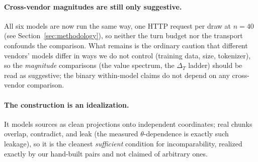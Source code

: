 \documentclass[11pt]{article}
\theoremstyle{plain}
\theoremstyle{definition}
\theoremstyle{remark}
\begin{document}
\paragraph{Cross-vendor magnitudes are still only suggestive.} All six models are now run the same
way, one HTTP request per draw at $n=40$ (see Section~\ref{sec:methodology}), so neither the turn
budget nor the transport confounds the comparison. What remains is the
ordinary caution that different vendors' models differ in ways we do not control (training data,
size, tokenizer), so the \emph{magnitude} comparisons (the value spectrum, the $\Delta_T$ ladder)
should be read as suggestive; the binary within-model claims do not depend on any cross-vendor
comparison.

\paragraph{The construction is an idealization.} It models sources as clean projections onto
independent coordinates; real chunks overlap, contradict, and leak (the measured
$\theta$-dependence is exactly such leakage), so it is the cleanest \emph{sufficient} condition
for incomparability, realized exactly by our hand-built pairs and not claimed of arbitrary ones.
\end{document}
